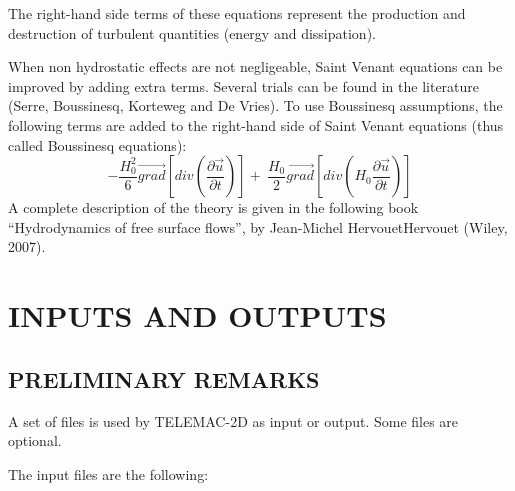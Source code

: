 \documentclass{article} %
\begin{document}
 The right-hand side terms of these equations represent the production and destruction of turbulent quantities (energy and dissipation).

 When non hydrostatic effects are not negligeable, Saint Venant equations can be improved by adding extra terms. Several trials can be found in the literature (Serre, Boussinesq, Korteweg and De Vries). To use Boussinesq assumptions, the following terms are added to the right-hand side of Saint Venant equations (thus called Boussinesq equations):
\[-\frac{H^2_0}{6}\overrightarrow{grad}\left[div\left(\frac{\partial \overrightarrow{u}}{\partial t}\right)\right]+\ \frac{H_0}{2}\overrightarrow{grad}\left[div\left(H_0\frac{\partial \overrightarrow{u}}{\partial t}\right)\right]\]
 A complete description of the theory is given in the following book ``Hydrodynamics of free surface flows'', by Jean-Michel HervouetHervouet (Wiley, 2007).




\section{  INPUTS AND OUTPUTS}


\subsection{ PRELIMINARY REMARKS}

 A set of files is used by TELEMAC-2D as input or output. Some files are optional.

 The input files are the following:
\end{document}
